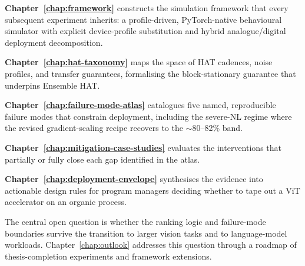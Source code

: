 \textbf{Chapter~\ref{chap:framework}} constructs the simulation framework that every subsequent experiment inherits: a profile-driven, PyTorch-native behavioural simulator with explicit device-profile substitution and hybrid analogue/digital deployment decomposition.

\textbf{Chapter~\ref{chap:hat-taxonomy}} maps the space of HAT cadences, noise profiles, and transfer guarantees, formalising the block-stationary guarantee that underpins Ensemble HAT.

\textbf{Chapter~\ref{chap:failure-mode-atlas}} catalogues five named, reproducible failure modes that constrain deployment, including the severe-NL regime where the revised gradient-scaling recipe recovers to the $\sim$80--82\% band.

\textbf{Chapter~\ref{chap:mitigation-case-studies}} evaluates the interventions that partially or fully close each gap identified in the atlas.

\textbf{Chapter~\ref{chap:deployment-envelope}} synthesises the evidence into actionable design rules for program managers deciding whether to tape out a ViT accelerator on an organic process.

The central open question is whether the ranking logic and failure-mode boundaries survive the transition to larger vision tasks and to language-model workloads.  Chapter~\ref{chap:outlook} addresses this question through a roadmap of thesis-completion experiments and framework extensions.
